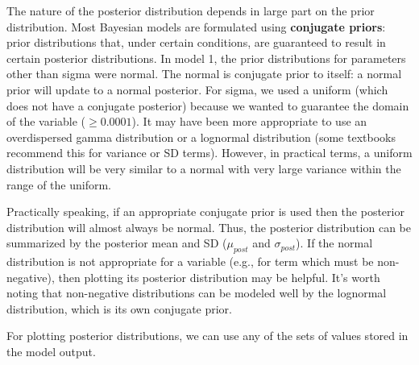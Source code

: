 \documentclass[
  13,
  letterpaper,
]{report}
\newenvironment{Shaded}{\begin{snugshade}}{\end{snugshade}}
\newcommand{\AttributeTok}[1]{\textcolor[rgb]{0.40,0.45,0.13}{#1}}
\newcommand{\CommentTok}[1]{\textcolor[rgb]{0.37,0.37,0.37}{#1}}
\newcommand{\FunctionTok}[1]{\textcolor[rgb]{0.28,0.35,0.67}{#1}}
\newcommand{\NormalTok}[1]{\textcolor[rgb]{0.00,0.23,0.31}{#1}}
\newcommand{\OtherTok}[1]{\textcolor[rgb]{0.00,0.23,0.31}{#1}}
\newcommand{\SpecialCharTok}[1]{\textcolor[rgb]{0.37,0.37,0.37}{#1}}
\newcommand{\StringTok}[1]{\textcolor[rgb]{0.13,0.47,0.30}{#1}}
\begin{document}
The nature of the posterior distribution depends in large part on the
prior distribution. Most Bayesian models are formulated using
\textbf{conjugate priors}: prior distributions that, under certain
conditions, are guaranteed to result in certain posterior distributions.
In model 1, the prior distributions for parameters other than sigma were
normal. The normal is conjugate prior to itself: a normal prior will
update to a normal posterior. For sigma, we used a uniform (which does
not have a conjugate posterior) because we wanted to guarantee the
domain of the variable (\(\geq0.0001\)). It may have been more
appropriate to use an overdispersed gamma distribution or a lognormal
distribution (some textbooks recommend this for variance or SD terms).
However, in practical terms, a uniform distribution will be very similar
to a normal with very large variance within the range of the uniform.

Practically speaking, if an appropriate conjugate prior is used then the
posterior distribution will almost always be normal. Thus, the posterior
distribution can be summarized by the posterior mean and SD
(\(\mu_{post}\) and \(\sigma_{post}\)). If the normal distribution is
not appropriate for a variable (e.g., for term which must be
non-negative), then plotting its posterior distribution may be helpful.
It's worth noting that non-negative distributions can be modeled well by
the lognormal distribution, which is its own conjugate prior.

For plotting posterior distributions, we can use any of the sets of
values stored in the model output.

\begin{Shaded}
\end{Shaded}
\end{document}
